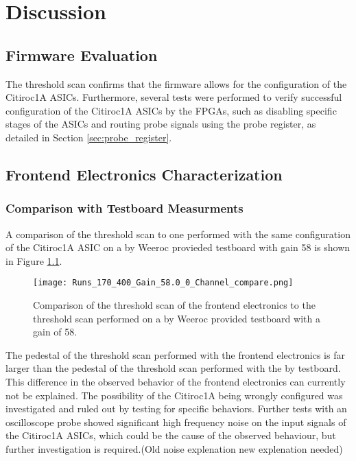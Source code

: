 \chapter{Discussion}\label{cha: discussion}
\section{Firmware Evaluation}
The threshold scan confirms that the firmware allows for the configuration of the Citiroc1A ASICs.
\newline
Furthermore, several tests were performed to verify successful configuration of the Citiroc1A ASICs by the FPGAs,
such as disabling specific stages of the ASICs and routing probe signals using the probe register, as detailed in Section \ref{sec:probe_register}.
\section{Frontend Electronics Characterization}
\subsection{Comparison with Testboard Measurments} 
A comparison of the threshold scan to one performed with the same configuration of the Citiroc1A ASIC on a by Weeroc provieded testboard with gain 58 is shown in Figure \ref{fig:threshold_scan_comparison_58}.%
\begin{figure}[H]
    \centering
    \texttt{[image: Runs\_170\_400\_Gain\_58.0\_0\_Channel\_compare.png]}
    \caption{Comparison of the threshold scan of the frontend electronics to the threshold scan performed on a by Weeroc provided testboard with a gain of 58.}
    \label{fig:threshold_scan_comparison_58}
\end{figure}

The pedestal of the threshold scan performed with the frontend electronics is far larger than the pedestal of the threshold scan performed with the by testboard.
This difference in the observed behavior of the frontend electronics can currently not be explained. The possibility of the Citiroc1A being wrongly configured was investigated and ruled out by testing for specific behaviors.
Further tests with an oscilloscope probe showed significant high frequency noise on the input signals of the Citiroc1A ASICs,
which could be the cause of the observed behaviour, but further investigation is required.(Old noise explenation new explenation needed)

